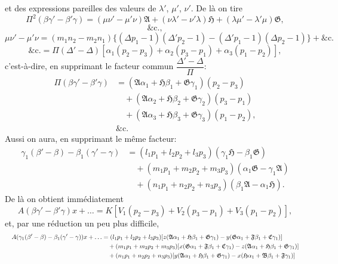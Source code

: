 \documentclass[11pt]{article}
\begin{document}
\noindent et des expressions pareilles des valeurs de $\lambda'$, $\mu'$, $\nu'$. De l\`a on tire
\[
\Pi^{2}(\beta\gamma' - \beta'\gamma) = (\mu\nu' - \mu'\nu)\mathfrak{A} + (\nu\lambda' - \nu'\lambda)\mathfrak{H} + (\lambda\mu' - \lambda'\mu)\mathfrak{G},
\]
\[
\&\text{c.},
\]
\[
\mu\nu' - \mu'\nu = (m_{1}n_{2} - m_{2}n_{1})\{(\Delta p_{1} - 1)(\Delta' p_{2} - 1) - (\Delta' p_{1} - 1)(\Delta p_{2} - 1)\} + \&\text{c.}
\]
\[
\&\text{c.} = \Pi(\Delta' - \Delta)[\alpha_{1}(p_{2} - p_{3}) + \alpha_{2}(p_{3} - p_{1}) + \alpha_{3}(p_{1} - p_{2})],
\]
c'est-\`a-dire, en supprimant le facteur commun $\dfrac{\Delta' - \Delta}{\Pi}$:
\[
\begin{aligned}
\Pi(\beta\gamma' - \beta'\gamma) &= (\mathfrak{A}\alpha_{1} + \mathfrak{H}\beta_{1} + \mathfrak{G}\gamma_{1})(p_{2} - p_{3})\\
&\quad + (\mathfrak{A}\alpha_{2} + \mathfrak{H}\beta_{2} + \mathfrak{G}\gamma_{2})(p_{3} - p_{1})\\
&\quad + (\mathfrak{A}\alpha_{3} + \mathfrak{H}\beta_{3} + \mathfrak{G}\gamma_{3})(p_{1} - p_{2}),\\
&\&\text{c.}
\end{aligned}
\]
Aussi on aura, en supprimant le m\^eme facteur:
\[
\begin{aligned}
\gamma_{1}(\beta' - \beta) - \beta_{1}(\gamma' - \gamma) &= (l_{1}p_{1} + l_{2}p_{2} + l_{3}p_{3})(\gamma_{1}\mathfrak{H} - \beta_{1}\mathfrak{G})\\
&\quad + (m_{1}p_{1} + m_{2}p_{2} + m_{3}p_{3})(\alpha_{1}\mathfrak{G} - \gamma_{1}\mathfrak{A})\\
&\quad + (n_{1}p_{1} + n_{2}p_{2} + n_{3}p_{3})(\beta_{1}\mathfrak{A} - \alpha_{1}\mathfrak{H}).
\end{aligned}
\]
De l\`a on obtient imm\'ediatement
\[
A(\beta\gamma' - \beta'\gamma)x + \dots = K[V_{1}(p_{2} - p_{3}) + V_{2}(p_{3} - p_{1}) + V_{3}(p_{1} - p_{2})],
\]
et, par une r\'eduction un peu plus difficile,
\[ \resizebox{\textwidth}{!}{$\displaystyle
\begin{aligned}
A(\gamma_{1}(\beta' - \beta) - \beta_{1}(\gamma' - \gamma))x + \dots
&= (l_{1}p_{1} + l_{2}p_{2} + l_{3}p_{3})[z(\mathfrak{A}\alpha_{1} + \mathfrak{H}\beta_{1} + \mathfrak{G}\gamma_{1}) - y(\mathfrak{G}\alpha_{1} + \mathfrak{F}\beta_{1} + \mathfrak{C}\gamma_{1})]\\
&\quad + (m_{1}p_{1} + m_{2}p_{2} + m_{3}p_{3})[x(\mathfrak{G}\alpha_{1} + \mathfrak{F}\beta_{1} + \mathfrak{C}\gamma_{1}) - z(\mathfrak{A}\alpha_{1} + \mathfrak{H}\beta_{1} + \mathfrak{G}\gamma_{1})]\\
&\quad + (n_{1}p_{1} + n_{2}p_{2} + n_{3}p_{3})[y(\mathfrak{A}\alpha_{1} + \mathfrak{H}\beta_{1} + \mathfrak{G}\gamma_{1}) - x(\mathfrak{H}\alpha_{1} + \mathfrak{B}\beta_{1} + \mathfrak{F}\gamma_{1})]
\end{aligned}
$} \]
\end{document}
